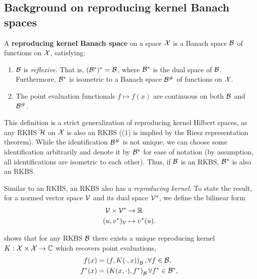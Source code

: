 \subsection{Background on reproducing kernel Banach spaces}

\begin{definition}
    A \textbf{reproducing kernel Banach space} on a space ${\mathcal{X}}$ is a Banach space ${\mathcal{B}}$ of functions on ${\mathcal{X}}$, satisfying:
    \begin{enumerate}
        \item ${\mathcal{B}}$ is \textit{reflexive}. That is, $({\mathcal{B}}^*)^* = {\mathcal{B}}$, where ${\mathcal{B}}^*$ is the dual space of ${\mathcal{B}}$. Furthermore, ${\mathcal{B}}^*$ is isometric to a Banach space ${\mathcal{B}}^\#$ of functions on ${\mathcal{X}}$.
        \item The point evaluation functionals $f \mapsto f(x)$ are continuous on both ${\mathcal{B}}$ and ${\mathcal{B}}^\#$.
    \end{enumerate}
\end{definition}

This definition is a strict generalization of reproducing kernel Hilbert spaces, as any RKHS ${\mathcal{H}}$ on ${\mathcal{X}}$ is also an RKBS ((1) is implied by the Riesz representation theorem). While the identification ${\mathcal{B}}^\#$ is not unique, we can choose some identification arbitrarily and denote it by ${\mathcal{B}}^*$ for ease of notation (by assumption, all identifications are isometric to each other). Thus, if ${\mathcal{B}}$ is an RKBS, ${\mathcal{B}}^*$ is also an RKBS.

Similar to an RKHS, an RKBS also has a \textit{reproducing kernel}. To state the result, for a normed vector space ${\mathcal{V}}$ and its dual space ${\mathcal{V}}^*$, we define the bilinear form
\begin{equation}\label{eq:bilinear_form}
    \begin{split}
        {\mathcal{V}} \times {\mathcal{V}}^* &\to \mathbb{R}\\
        (u, v^*)_{\mathcal{V}} &\mapsto v^*(u).
    \end{split}
\end{equation}

\parencite[Theorem 2]{zhangReproducingKernel2009} shows that for any RKBS ${\mathcal{B}}$ there exists a unique reproducing kernel $K: {\mathcal{X}} \times {\mathcal{X}} \to {\mathbb{C}}$ which recovers point evaluations,
\begin{align}
    f(x) &= \left(f, K(\cdot, x)\right)_{\mathcal{B}}, \forall f \in {\mathcal{B}}, \\
    f^*(x) &= \left(K(x, \cdot), f^*\right)_{\mathcal{B}} \forall f^* \in {\mathcal{B}}^*,
\end{align}

